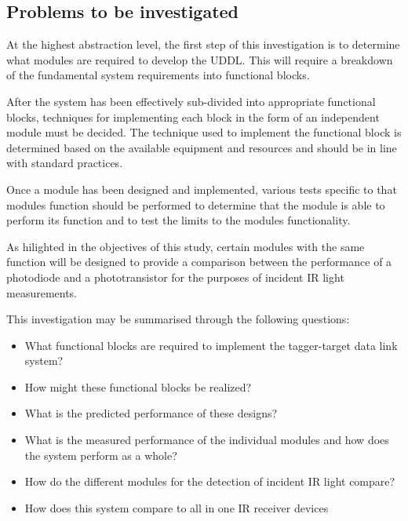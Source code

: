 \subsection{Problems to be investigated}

At the highest abstraction level, the first step of this investigation is to determine what modules are required to develop the UDDL. This will require a breakdown of the fundamental system requirements into functional blocks.

After the system has been effectively sub-divided into appropriate functional blocks, techniques for implementing each block in the form of an independent module must be decided. The technique used to implement the functional block is determined based on the available equipment and resources and should be in line with standard practices.

Once a module has been designed and implemented, various tests specific to that modules function should be performed to determine that the module is able to perform its function and to test the limits to the modules functionality.

As hilighted in the objectives of this study, certain modules with the same function will be designed to provide a comparison between the performance of a photodiode and a phototransistor for the purposes of incident IR light measurements.

This investigation may be summarised through the following questions:

\begin{itemize}
	\item What functional blocks are required to implement the tagger-target data link system?
	\item How might these functional blocks be realized?
	\item What is the predicted performance of these designs?
	\item What is the measured performance of the individual modules and how does the system perform as a whole?
	\item How do the different modules for the detection of incident IR light compare?
	\item How does this system compare to all in one IR receiver devices
%	
\end{itemize}


